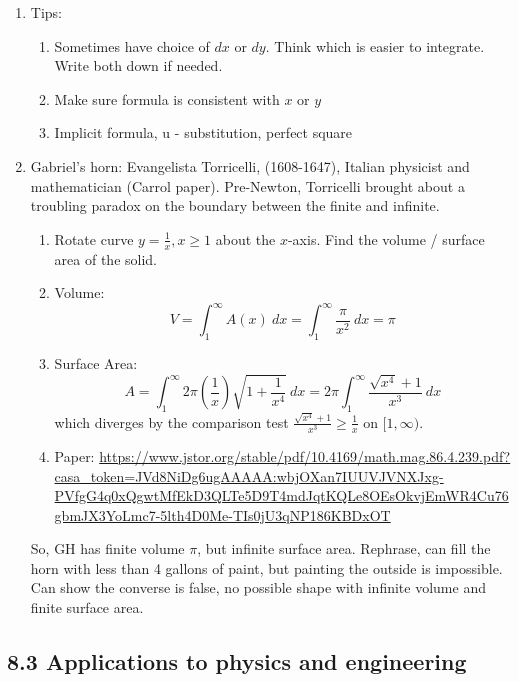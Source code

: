 \documentclass{article}
\begin{document}
\begin{enumerate}
\item Tips:
\begin{enumerate}
\item Sometimes have choice of $dx$ or $dy$. Think which is easier to integrate. Write both down if needed.
\item Make sure formula is consistent with $x$ or $y$
\item Implicit formula, u - substitution, perfect square
\end{enumerate}

\item Gabriel's horn: Evangelista Torricelli, (1608-1647), Italian physicist and mathematician (Carrol paper). Pre-Newton, Torricelli brought about a troubling paradox on the boundary between the finite and infinite.
\begin{enumerate}
\item Rotate curve $y=\frac{1}{x}, x\geq 1$ about the $x$-axis. Find the volume / surface area of the solid.
\item Volume: 
\[
V = \int_1^{\infty} A(x)~dx = \int_1^{\infty} \frac{\pi}{x^2}~dx = \pi
\]
\item Surface Area:
\[
A = \int_1^{\infty} 2\pi \left(\frac{1}{x}\right)\sqrt{1+\frac{1}{x^4}}~dx = 2\pi \int_1^{\infty} \frac{\sqrt{x^4}+1}{x^3}~dx  
\]
which diverges by the comparison test $\frac{\sqrt{x^4}+1}{x^3}\geq \frac{1}{x}$ on $[1,\infty)$.
\item Paper: \url{https://www.jstor.org/stable/pdf/10.4169/math.mag.86.4.239.pdf?casa_token=JVd8NiDg6ugAAAAA:wbjOXan7IUUVJVNXJxg-PVfgG4q0xQgwtMfEkD3QLTe5D9T4mdJqtKQLe8OEsOkvjEmWR4Cu76gbmJX3YoLmc7-5lth4D0Me-TIs0jU3qNP186KBDxOT}
\end{enumerate}
So, GH has finite volume $\pi$, but infinite surface area. Rephrase, can fill the horn with less than 4 gallons of paint, but painting the outside is impossible. Can show the converse is false, no possible shape with infinite volume and finite surface area. 
\end{enumerate}


\subsection{8.3 Applications to physics and engineering}
\end{document}
